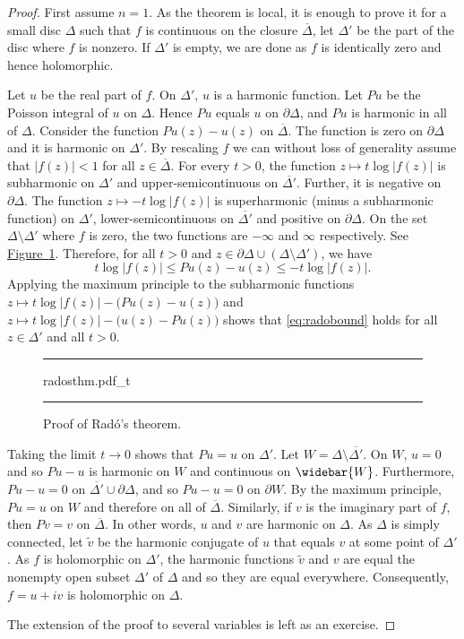\documentclass[12pt,openany]{book}
\newcommand{\abs}[1]{\left\lvert {#1} \right\rvert}
\theoremstyle{plain}
\theoremstyle{remark}
\theoremstyle{definition}
\newenvironment{myfig}{%
\begin{figure}[h!t]
\noindent\rule{\textwidth}{0.5pt}\vspace{12pt}\par\centering}%
{\par\noindent\rule{\textwidth}{0.5pt}
\end{figure}}
\theoremstyle{exercise}
\theoremstyle{example}
\newcommand{\figureref}[1]{\hyperref[#1]{Figure~\ref*{#1}}}
\begin{document}
\begin{proof}
First assume $n=1$.  As the theorem is local, it is
enough to prove it for a small disc $\Delta$ such that $f$ is continuous
on the closure $\overline{\Delta}$, let $\Delta'$ be the part of the disc
where $f$ is nonzero.  If $\Delta'$ is empty, we are done as
$f$ is identically zero and hence holomorphic.

Let $u$ be the real part of $f$.  On $\Delta'$, $u$ is a harmonic function.
Let $Pu$ be the Poisson integral of $u$ on $\Delta$.  Hence $Pu$
equals $u$ on $\partial \Delta$, and $Pu$ is harmonic in all of $\Delta$.
Consider the function
$Pu(z) - u(z)$ on $\overline{\Delta}$.  The function is zero
on $\partial \Delta$ and it is harmonic on $\Delta'$.  By rescaling $f$
we can without loss of generality assume that $\abs{f(z)} < 1$ for all $z
\in \overline{\Delta}$.  For every $t >0$, the function
$z \mapsto t \log \abs{f(z)}$ is subharmonic on $\Delta'$ and
upper-semicontinuous on $\overline{\Delta'}$.  Further, it is negative
on $\partial \Delta$.  The function $z \mapsto -t \log \abs{f(z)}$ is
superharmonic (minus a subharmonic function) on $\Delta'$,
lower-semicontinuous on $\overline{\Delta'}$ and positive on $\partial
\Delta$.  On the set $\Delta \setminus \Delta'$ where $f$ is zero, the two functions are $-\infty$ and
$\infty$ respectively.
See \figureref{fig:radosthm}.
Therefore, for all $t > 0$ and
$z \in \partial \Delta \cup (\Delta \setminus \Delta')$,
we have
\begin{equation} \label{eq:radobound}
t \log \abs{f(z)} \leq Pu(z)-u(z) \leq -t \log \abs{f(z)}  .
\end{equation}
Applying the maximum principle to the subharmonic functions
$z \mapsto t \log \abs{f(z)} - \bigl(Pu(z)-u(z)\bigr)$
and
$z \mapsto t \log \abs{f(z)} - \bigl(u(z)-Pu(z)\bigr)$
shows that
\eqref{eq:radobound} holds for all $z \in \Delta'$ and all $t > 0$.

\begin{myfig}
{radosthm.pdf_t}
\caption{Proof of Rad\'o's theorem.\label{fig:radosthm}}
\end{myfig}


Taking the limit
$t \to 0$ shows that $Pu = u$ on $\Delta'$.
Let $W = \Delta \setminus \overline{\Delta'}$.
On $W$, $u=0$ and so $Pu-u$ is harmonic on $W$
and continuous on $\widebar{W}$.  Furthermore,
$Pu-u=0$ on $\overline{\Delta'} \cup \partial \Delta$,
and so $Pu-u=0$ on $\partial W$.  By the maximum principle, $Pu=u$ on $W$
and therefore on all of $\overline{\Delta}$.
Similarly, if $v$ is the imaginary part of $f$, then $Pv = v$ on
$\overline{\Delta}$.
In other words, $u$ and $v$ are harmonic on $\Delta$.
As $\Delta$ is simply connected,
let $\tilde{v}$ be the harmonic conjugate of $u$ that equals $v$ at
some point of $\Delta'$.  As $f$ is holomorphic on $\Delta'$,
the harmonic functions $\tilde{v}$ and $v$
are equal the nonempty open subset $\Delta'$ of $\Delta$ and so
they are equal everywhere.  Consequently, $f = u +iv$ is holomorphic on
$\Delta$.

The extension of the proof to several variables is left as an exercise.
\end{proof}
\end{document}
